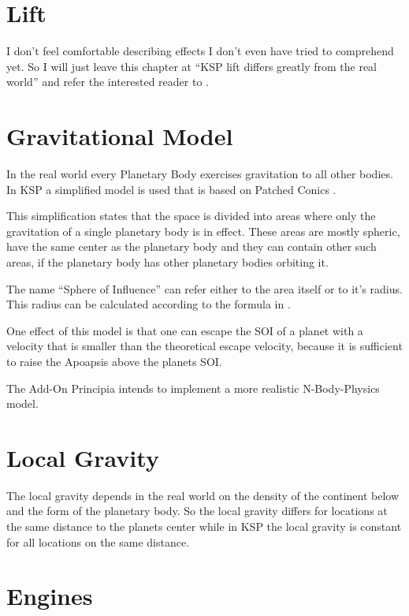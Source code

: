 \documentclass[11pt]{report}
\begin{document}
\section{Lift}

I don't feel comfortable describing effects I don't even have tried to
comprehend yet. So I will just leave this chapter at ``KSP lift
differs greatly from the real world'' and refer the interested reader
to \cite{FAR}.

\section{Gravitational Model}

In the real world every Planetary Body exercises gravitation to all
other bodies.  In KSP a simplified model is used that is based on
Patched Conics  \cite{PatchedConics}.

This simplification states that the space is divided into areas where
only the gravitation of a single planetary body is in effect.  These
areas are mostly spheric, have the same center as the planetary body
and they can contain other such areas, if the planetary body has other
planetary bodies orbiting it.

The name ``Sphere of Influence''  can refer
either to the area itself or to it's radius. This radius can be
calculated according to the formula in \cite{SphereOfInfluence}.

One effect of this model is that one can escape the SOI of a planet
with a velocity that is smaller than the theoretical escape velocity,
 because it is sufficient to raise the Apoapsis
above the planets SOI.

The Add-On Principia \cite{principia} intends to implement a more
realistic N-Body-Physics  model.

\section{Local Gravity}

The local gravity depends in the real world on the density of the
continent below and the form of the planetary body. So the local
gravity differs for locations at the same distance to the planets
center while in KSP the local gravity is constant for all locations on
the same distance.

\section{Engines}
\end{document}
